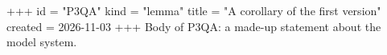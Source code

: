 +++
id = "P3QA"
kind = "lemma"
title = "A corollary of the first version"
created = 2026-11-03
+++
Body of P3QA: a made-up statement about the model system.
